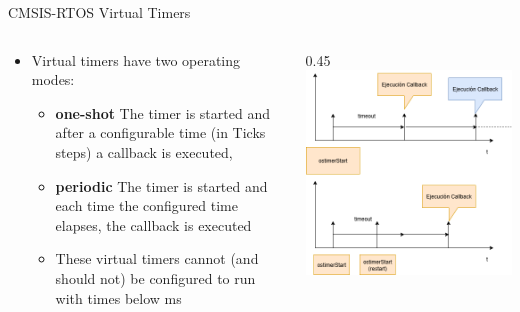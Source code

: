 \begin{frame}[fragile]{CMSIS-RTOS Virtual Timers}
    \begin{columns}
        \begin{column}{0.55\textwidth}
        \begin{itemize}
        \item Virtual timers have two operating modes:
        \begin{itemize}
            \item \textbf{one-shot} The timer is started and after a configurable time (in Ticks steps) a callback is executed,
            \item \textbf{periodic} The timer is started and each time the configured time elapses, the callback is executed
            \item These virtual timers cannot (and should not) be configured to run with times below ms
        \end{itemize}
        \end{itemize}
        \end{column}
        \begin{column} {0.45\textwidth}
        \includegraphics[scale=0.25]{presentation/softwaretimers.drawio.png}
     \end{column}
    \end{columns}
\end{frame}

